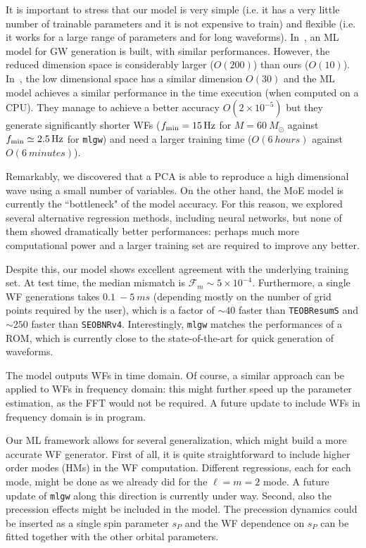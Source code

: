 \documentclass[twocolumn,showpacs,preprintnumbers,nofootinbib,prd,
superscriptaddress,10pt]{revtex4-1}
\begin{document}
It is important to stress that our model is very simple (i.e. it has a very little number of trainable parameters and 
it is not expensive to train) and flexible (i.e. it works for a large range of parameters and for long waveforms).
In~\cite{Chua_2019}, an ML model for GW generation is built, with similar performances.
However, the reduced dimension space is considerably larger ($O(200)$) than ours ($O(10)$).
In~\cite{Khan:2020fso}, the low dimensional space has a similar dimension $O(30)$ and the ML model achieves a similar performance in the time execution (when computed on a CPU). They manage to achieve a better accuracy $O(2\times10^{-5})$ but they generate significantly shorter WFs ($f_{\rm min} = \SI{15}{Hz}$ for $M = \SI{60}{M_{\odot}}$ against $f_{\rm min} \simeq \SI{2.5}{Hz}$ for \texttt{mlgw}) and need a larger training time ($O(\SI{6}{hours})$ against $O(\SI{6}{minutes})$).

Remarkably, we discovered that a PCA is able to reproduce a high dimensional wave using a small number of variables.
On the other hand, the MoE model is currently the ``bottleneck" of the model accuracy. For this reason, we explored 
several alternative regression methods, including neural networks, but none of them showed dramatically better 
performances: perhaps much more computational power and a larger training set are required to improve any better.

Despite this, our model shows excellent agreement with the underlying training set. At test time, 
the median mismatch is ${\mathcal{F}_m\sim 5 \times 10^{-4}}$.
Furthermore, a single WF generations takes $\SI{0.1}{}-\SI{5}{ms}$ (depending mostly on the 
number of grid points required by the user), which is a factor of $\sim 40$ faster than \texttt{TEOBResumS}
and $\sim 250$ faster than \texttt{SEOBNRv4}.
Interestingly, \texttt{mlgw} matches the performances of a ROM, which is currently close to the state-of-the-art 
for quick generation of waveforms.

The model outputs WFs in time domain. Of course, a similar approach can be applied to WFs in frequency domain: 
this might further speed up the parameter estimation, as the FFT would not be required. A future update to include 
WFs in frequency domain is in program.

Our ML framework allows for several generalization, which might build a more accurate WF generator.
First of all, it is quite straightforward to include higher order modes (HMs) in the WF computation. 
Different regressions, each for each mode, might be done as we already did for the $\ell=m=2$ mode. 
A future update of \texttt{mlgw} along this direction is currently under way.
Second, also the precession effects might be included in the model.
The precession dynamics could be inserted as a single spin parameter $s_P$ \cite{Schmidt2015Precession} 
and the WF dependence on $s_P$ can be fitted together with the other orbital parameters.
\end{document}
